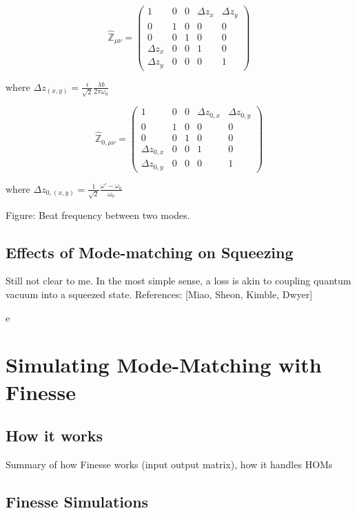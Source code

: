 \documentclass[oneside]{book}
\begin{document}
		
		\begin{equation} \label{waistloc_matrix}
		\hat{\mathbb{Z}}_{\mu \nu} = 
		\begin{pmatrix}
		1				&0		&0		&\Delta z_x 	&\Delta z_y  
		\\ 0			&1		&0		&0 				&0
		\\ 0			&0		&1		&0 				&0
		\\ \Delta z_x	&0		&0		&1 				&0
		\\ \Delta z_y	&0		&0		&0				&1 
		\end{pmatrix}
		\end{equation}
		
		where $\Delta z_{(x,y)} =  \frac{i}{\sqrt{2}} \frac{\lambda b}{2\pi\omega_{0}} $
		
		
		\begin{equation} \label{waistsize_matrix}
		\hat{\mathbb{Z}}_{0, \mu \nu} = 
		\begin{pmatrix}
		1					&0		&0		&\Delta z_{0,x} 	&\Delta z_{0,y} 
		\\ 0				&1		&0		&0 					&0
		\\ 0				&0		&1		&0 					&0
		\\ \Delta z_{0,x} 	&0		&0		&1 					&0
		\\ \Delta z_{0,y} 	&0		&0		&0					&1 
		\end{pmatrix}
		\end{equation}

		where $\Delta z_{0,(x,y)} =   \frac{1}{\sqrt{2}} \frac{\omega'-\omega_{0}}{\omega_{0}} $

		Figure: Beat frequency between two modes.

		\section{Effects of Mode-matching on Squeezing}
		Still not clear to me.
		In the most simple sense, a loss is akin to coupling quantum vacuum into a squeezed state.
		References: [Miao, Sheon, Kimble, Dwyer]
	
	
e\chapter{Simulating Mode-Matching with Finesse}	
	\section{How it works}
	Summary of how Finesse works (input output matrix), how it handles HOMs
	\section{Finesse Simulations}
\end{document}
